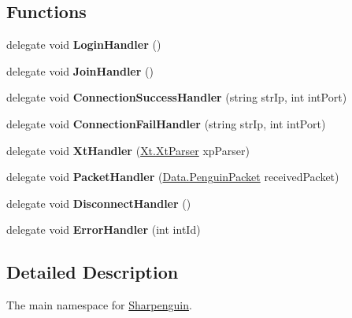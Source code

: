 \subsection*{Functions}
\begin{DoxyCompactItemize}
\item 
\hypertarget{namespaceSharpenguin_a3fe182151524c2bb5fac5bc386a00958}{delegate void {\bfseries Login\-Handler} ()}\label{namespaceSharpenguin_a3fe182151524c2bb5fac5bc386a00958}

\item 
\hypertarget{namespaceSharpenguin_a5ba375cdd84112abe9c2a5c1ea431730}{delegate void {\bfseries Join\-Handler} ()}\label{namespaceSharpenguin_a5ba375cdd84112abe9c2a5c1ea431730}

\item 
\hypertarget{namespaceSharpenguin_ace89e9f8a53e32105b4b8b7205dc39fc}{delegate void {\bfseries Connection\-Success\-Handler} (string str\-Ip, int int\-Port)}\label{namespaceSharpenguin_ace89e9f8a53e32105b4b8b7205dc39fc}

\item 
\hypertarget{namespaceSharpenguin_aac9861f4e28dcf1d91190fbc8bb3a34a}{delegate void {\bfseries Connection\-Fail\-Handler} (string str\-Ip, int int\-Port)}\label{namespaceSharpenguin_aac9861f4e28dcf1d91190fbc8bb3a34a}

\item 
\hypertarget{namespaceSharpenguin_aabe05957554f393f8ac42f3638fbe3d2}{delegate void {\bfseries Xt\-Handler} (\hyperlink{classSharpenguin_1_1Xt_1_1XtParser}{Xt.\-Xt\-Parser} xp\-Parser)}\label{namespaceSharpenguin_aabe05957554f393f8ac42f3638fbe3d2}

\item 
\hypertarget{namespaceSharpenguin_ab8e8d3abbe4092eff0a110543db5d61f}{delegate void {\bfseries Packet\-Handler} (\hyperlink{classSharpenguin_1_1Data_1_1PenguinPacket}{Data.\-Penguin\-Packet} received\-Packet)}\label{namespaceSharpenguin_ab8e8d3abbe4092eff0a110543db5d61f}

\item 
\hypertarget{namespaceSharpenguin_a67fd56044a18342181ce6f25b81ee93e}{delegate void {\bfseries Disconnect\-Handler} ()}\label{namespaceSharpenguin_a67fd56044a18342181ce6f25b81ee93e}

\item 
\hypertarget{namespaceSharpenguin_aad92c96a7e3460249d9a403dee76dc69}{delegate void {\bfseries Error\-Handler} (int int\-Id)}\label{namespaceSharpenguin_aad92c96a7e3460249d9a403dee76dc69}

\end{DoxyCompactItemize}


\subsection{Detailed Description}
The main namespace for \hyperlink{namespaceSharpenguin}{Sharpenguin}. 